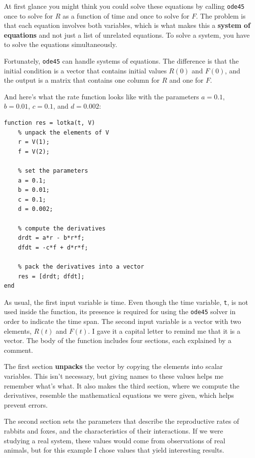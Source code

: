 \documentclass[
]{book}
\begin{document}
At first glance you might think you could solve these equations by
calling {\tt ode45} once to solve for $R$ as a function of time and
once to solve for $F$.  The problem is that each equation involves
both variables, which is what makes this a {\bf system of equations}
and not just a list of unrelated equations.  To solve a system, you
have to solve the equations simultaneously.

Fortunately, {\tt ode45} can handle systems of equations.  The
difference is that the initial condition is a vector that contains
initial values $R(0)$ and $F(0)$, and the output is a matrix
that contains one column for $R$ and one for $F$.

And here's what the rate function looks like
with the parameters $a = 0.1$, $b = 0.01$, $c = 0.1$, and $d = 0.002$:

\begin{verbatim}
function res = lotka(t, V)
    % unpack the elements of V
    r = V(1);
    f = V(2);

    % set the parameters
    a = 0.1;
    b = 0.01;
    c = 0.1;
    d = 0.002;

    % compute the derivatives
    drdt = a*r - b*r*f;
    dfdt = -c*f + d*r*f;

    % pack the derivatives into a vector
    res = [drdt; dfdt];
end
\end{verbatim}

As usual, the first input variable is time.
Even though the time variable, {\tt t},
is not used inside the function, its presence is required for
using the {\tt ode45} solver in order to indicate the time span.
The second input variable is a vector with two elements,
$R(t)$ and $F(t)$.  I gave it a capital letter to remind me that it
is a vector.  The body of the function includes four sections,
each explained by a comment.

The first section {\bf unpacks} the vector by copying the elements
into scalar variables.  This isn't necessary, but giving names to
these values helps me remember what's what.  It also makes the third
section, where we compute the derivatives, resemble the mathematical
equations we were given, which helps prevent errors.

The second section sets the parameters that describe the
reproductive rates of rabbits and foxes, and the characteristics of
their interactions.  If we were studying a real system, these values
would come from observations of real animals, but for this example
I chose values that yield interesting results.
\end{document}
